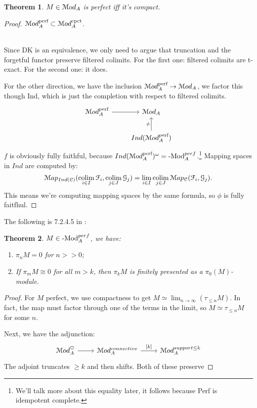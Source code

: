 \documentclass[10pt,a4paper,reqno,oneside]{book} %
\theoremstyle{plain}
\newtheorem{thm}{Theorem}[section]
\theoremstyle{definition}
\theoremstyle{remark}
\numberwithin{equation}{section}
\begin{document}
\begin{thm}
$M \in \mathcal M od_A$ is perfect iff it's compact.
\end{thm}
\begin{proof}
$\mathcal M od_A^{\text{perf}} \subset \mathcal M od_A^{\text{cpct}}$. 
\[
\begin{tikzcd}
\;
\end{tikzcd}
\]

Since DK is an equivalence, we only need to argue that truncation and the forgetful functor preserve filtered colimits.
For the first one: filtered colimits are t-exact. For the second one: it does.

For the other direction, we have the inclusion $\mathcal M od_A^{\text{perf}} \to \mathcal M od_A$, we factor this though Ind, which
is just the completion with respect to filtered colimits.
\[
\begin{tikzcd}
\cM od_A^{\text{perf}} \arrow{r} & \cM od_A \\
 & Ind(\cM od_A^{\text{perf}}) \arrow{u}{\phi}
\end{tikzcd}
\]
$f$ is obviously fully faithful, because $Ind(\mathcal M od_A^{\text{perf}})^{\omega} = \textrm{-}\mathrm{Mod}_A^{perf}$.\footnote{We'll talk more about
this equality later, it follows because Perf is idempotent complete.} Mapping spaces
in $Ind$ are computed by:
\[ \mathcal M ap_{Ind(\mathcal C)}(\operatorname*{colim}_{i \in I} \mathcal{F}_i, \operatorname*{colim}_{j \in J} \mathcal{G}_j)	
= \lim_{i \in I} \operatorname*{colim}_{j \in J}	\mathcal M ap_{\mathcal C}(\mathcal{F}_i, \mathcal{G}_j) .\]
This means we're computing mapping spaces by the same formula, so $\phi$ is fully faitfhul.
\end{proof}

The following is 7.2.4.5 in \cite{Lurie_Higher_algebra}:
\begin{thm}
$M \in \textrm{-}\mathrm{Mod}_A^{perf}$, we have:
\begin{enumerate}
\item $\pi_n M = 0$ for $n >>0$;
\item If $\pi_m M \cong 0$ for all $m>k$, then $\pi_k M$ is finitely presented as a $\pi_0(M)$-module.
\end{enumerate}
\end{thm}

\begin{proof}
For $M$ perfect, we use compactness to get $M \simeq \lim_{n\to \infty} (\tau_{\leq n} M)$. In fact, the map must
factor through one of the terms in the limit, so $M \simeq \tau_{\leq n}M$ for some $n$.

Next, we have the adjunction:
\[
\begin{tikzcd}
\cM od_A^{\heartsuit} \arrow{r} & \cM od_A^{connective} \arrow{r}{[k]} & \cM od_A^{support \leq k}
\end{tikzcd}
\]
The adjoint truncates $\geq k$ and then shifts. Both of these preserve  
\end{proof}
\end{document}
